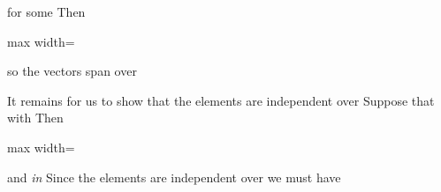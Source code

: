 \documentclass[11pt,oneside]{article}
\begin{document}
\begin{BookBody}
\noindent for some  Then

\begin{center}\begin{adjustbox}{max width=\linewidth}\end{adjustbox}\end{center}

\noindent so the  vectors  span  over 

It remains for us to show that the  elements  are independent over  Suppose that  with  Then

\begin{center}\begin{adjustbox}{max width=\linewidth}\end{adjustbox}\end{center}

\noindent and \BookInline{(\Sigma }\textit{in} Since the elements  are independent over  we must have

\end{BookBody}

\BookNarrativetrue
\end{document}
